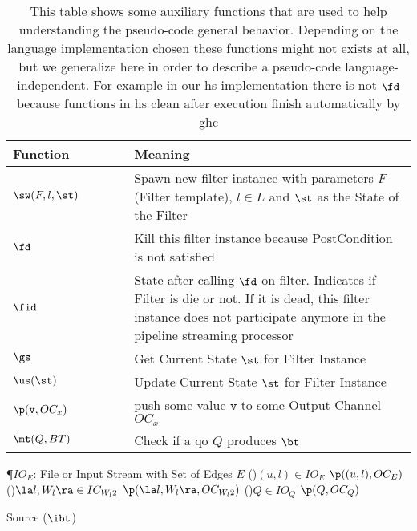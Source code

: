 \begin{table}[!htp]
\centering
\begin{tabular}{|p{0.3\linewidth}|p{0.7\linewidth}|} \hline
\textbf{Function} & \textbf{Meaning}\\ \hline
$\sw(F,l,\st)$ & Spawn new filter instance with parameters $F$ (Filter template), $l \in L$ and $\st$ as the State of the Filter\\\hline
$\fd$ & Kill this filter instance because PostCondition is not satisfied\\ \hline
$\fid$ & State after calling $\fd$ on filter. Indicates if Filter is die or not. If it is dead, this filter instance does not participate anymore in the pipeline streaming processor\\ \hline
$\gs$ & Get Current State $\st$ for Filter Instance \\ \hline
$\us(\st)$ & Update Current State $\st$ for Filter Instance \\ \hline
$\p(\mathtt{v}, OC_x)$ & push some value $\mathtt{v}$ to some Output Channel $OC_x$ \\\hline
$\mt(Q, BT)$ & Check if a \acrshort{qo} $Q$ produces $\bt$ \\ \hline
\end{tabular}
\caption[{[\acrshort{iebt}] Summary of auxiliary functions for handling \acrshort{dpbt} internals}]{This table shows some auxiliary functions that are used to help understanding the pseudo-code general behavior. Depending on the language implementation chosen these functions might not exists at all, but we generalize here in order to describe a pseudo-code language-independent. For example in our \acrshort{hs} implementation there is not $\fd$ because functions in \acrshort{hs} clean after execution finish automatically by \acrshort{ghc}}
\label{table:aux:fn}
\end{table}
      
\begin{algorithm}
\SetAlgoRefName{[A1]}
\P{$IO_E$: File or Input Stream with Set of Edges $E$}
\ForAll(){$(u,l) \in IO_E$}
{$\p((u,l), OC_E)$ \label{algo:source:1}
}
\ForAll(){$\la l, W_l \ra \in IC_{W_l2}$}
{$\p(\la l, W_l \ra, OC_{W_l2})$ \label{algo:source:2}
}
\ForAll(){$Q \in IO_Q$}
{$\p(Q, OC_Q)$ \label{algo:source:3}
}
\caption{Source ($\ibt$)}
\label{algo:source}
\end{algorithm}

